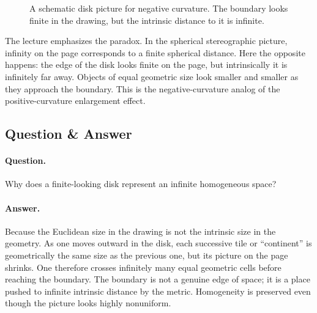 \begin{figure}[htbp]
\centering
{}
\caption{A schematic disk picture for negative curvature. The boundary looks finite in the drawing, but the intrinsic distance to it is infinite.}
\end{figure}

The lecture emphasizes the paradox. In the spherical stereographic picture, infinity on the page corresponds to a finite spherical distance. Here the opposite happens: the edge of the disk looks finite on the page, but intrinsically it is infinitely far away. Objects of equal geometric size look smaller and smaller as they approach the boundary. This is the negative-curvature analog of the positive-curvature enlargement effect.

\subsection{Question \& Answer}

\paragraph{Question.} Why does a finite-looking disk represent an infinite homogeneous space?

\paragraph{Answer.} Because the Euclidean size in the drawing is not the intrinsic size in the geometry. As one moves outward in the disk, each successive tile or ``continent'' is geometrically the same size as the previous one, but its picture on the page shrinks. One therefore crosses infinitely many equal geometric cells before reaching the boundary. The boundary is not a genuine edge of space; it is a place pushed to infinite intrinsic distance by the metric. Homogeneity is preserved even though the picture looks highly nonuniform.

